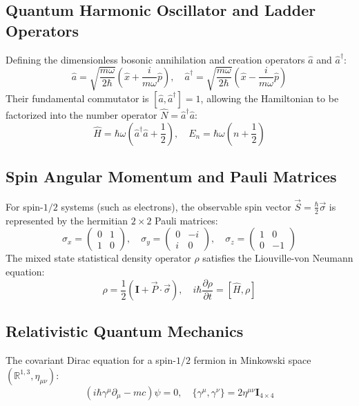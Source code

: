 \documentclass{article}
\begin{document}
\subsection{Quantum Harmonic Oscillator and Ladder Operators}
Defining the dimensionless bosonic annihilation and creation operators $\hat{a}$ and $\hat{a}^\dagger$:
\[
\hat{a} = \sqrt{\frac{m\omega}{2\hbar}} \left( \hat{x} + \frac{i}{m\omega}\hat{p} \right), \quad \hat{a}^\dagger = \sqrt{\frac{m\omega}{2\hbar}} \left( \hat{x} - \frac{i}{m\omega}\hat{p} \right)
\]
Their fundamental commutator is $[\hat{a}, \hat{a}^\dagger] = 1$, allowing the Hamiltonian to be factorized into the number operator $\hat{N} = \hat{a}^\dagger \hat{a}$:
\[
\hat{H} = \hbar \omega \left( \hat{a}^\dagger \hat{a} + \frac{1}{2} \right), \quad E_n = \hbar \omega \left( n + \frac{1}{2} \right)
\]

\subsection{Spin Angular Momentum and Pauli Matrices}
For spin-$1/2$ systems (such as electrons), the observable spin vector $\vec{S} = \frac{\hbar}{2}\vec{\sigma}$ is represented by the hermitian $2 \times 2$ Pauli matrices:
\[
\sigma_x = \begin{pmatrix} 0 & 1 \\ 1 & 0 \end{pmatrix}, \quad \sigma_y = \begin{pmatrix} 0 & -i \\ i & 0 \end{pmatrix}, \quad \sigma_z = \begin{pmatrix} 1 & 0 \\ 0 & -1 \end{pmatrix}
\]
The mixed state statistical density operator $\rho$ satisfies the Liouville-von Neumann equation:
\[
\rho = \frac{1}{2}\left( \mathbf{I} + \vec{P} \cdot \vec{\sigma} \right), \quad i \hbar \frac{\partial \rho}{\partial t} = [\hat{H}, \rho]
\]

\subsection{Relativistic Quantum Mechanics}
The covariant Dirac equation for a spin-$1/2$ fermion in Minkowski space $(\mathbb{R}^{1,3}, \eta_{\mu\nu})$:
\[
\left( i \hbar \gamma^\mu \partial_\mu - mc \right) \psi = 0, \quad \{\gamma^\mu, \gamma^\nu\} = 2\eta^{\mu\nu}\mathbf{I}_{4\times 4}
\]
\end{document}
